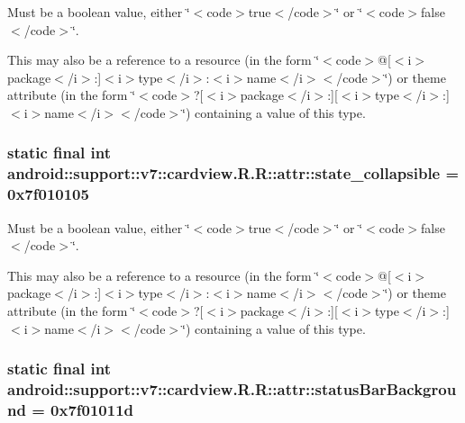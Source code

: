 Must be a boolean value, either \char`\"{}$<$code$>$true$<$/code$>$\char`\"{} or \char`\"{}$<$code$>$false$<$/code$>$\char`\"{}. 

This may also be a reference to a resource (in the form \char`\"{}$<$code$>$@\mbox{[}$<$i$>$package$<$/i$>$:\mbox{]}$<$i$>$type$<$/i$>$:$<$i$>$name$<$/i$>$$<$/code$>$\char`\"{}) or theme attribute (in the form \char`\"{}$<$code$>$?\mbox{[}$<$i$>$package$<$/i$>$:\mbox{]}\mbox{[}$<$i$>$type$<$/i$>$:\mbox{]}$<$i$>$name$<$/i$>$$<$/code$>$\char`\"{}) containing a value of this type. \hypertarget{classandroid_1_1support_1_1v7_1_1cardview_1_1_r_1_1attr_d8de488fe4ab2e95cc76bf546c4feb35}{
\subsubsection[{state\_\-collapsible}]{\setlength{\rightskip}{0pt plus 5cm}static final int android::support::v7::cardview.R.R::attr::state\_\-collapsible = 0x7f010105}}
\label{classandroid_1_1support_1_1v7_1_1cardview_1_1_r_1_1attr_d8de488fe4ab2e95cc76bf546c4feb35}


Must be a boolean value, either \char`\"{}$<$code$>$true$<$/code$>$\char`\"{} or \char`\"{}$<$code$>$false$<$/code$>$\char`\"{}. 

This may also be a reference to a resource (in the form \char`\"{}$<$code$>$@\mbox{[}$<$i$>$package$<$/i$>$:\mbox{]}$<$i$>$type$<$/i$>$:$<$i$>$name$<$/i$>$$<$/code$>$\char`\"{}) or theme attribute (in the form \char`\"{}$<$code$>$?\mbox{[}$<$i$>$package$<$/i$>$:\mbox{]}\mbox{[}$<$i$>$type$<$/i$>$:\mbox{]}$<$i$>$name$<$/i$>$$<$/code$>$\char`\"{}) containing a value of this type. \hypertarget{classandroid_1_1support_1_1v7_1_1cardview_1_1_r_1_1attr_ed4d045fb2d5038019e9838e878192ed}{
\subsubsection[{statusBarBackground}]{\setlength{\rightskip}{0pt plus 5cm}static final int android::support::v7::cardview.R.R::attr::statusBarBackground = 0x7f01011d}}
\label{classandroid_1_1support_1_1v7_1_1cardview_1_1_r_1_1attr_ed4d045fb2d5038019e9838e878192ed}


